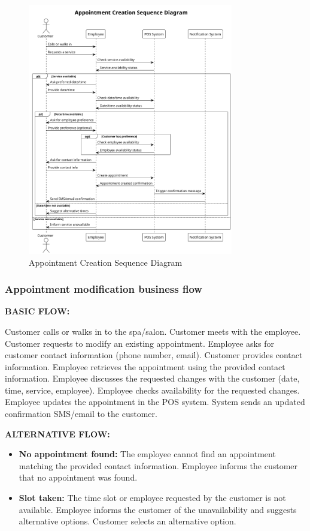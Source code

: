 \documentclass[]{VUMIFTemplateClass}
\begin{document}
\begin{figure}[H]
    \centering
    \includegraphics[width=0.8\textwidth]{images/diagrams/services/appointment_creation_sequence.png}
    \caption{Appointment Creation Sequence Diagram}
    \label{fig:appointment_creation_sequence}
\end{figure}

\subsubsection{Appointment modification business flow}

\textbf{BASIC FLOW:}

Customer calls or walks in to the spa/salon.
Customer meets with the employee.
Customer requests to modify an existing appointment.
Employee asks for customer contact information (phone number, email).
Customer provides contact information.
Employee retrieves the appointment using the provided contact information.
Employee discusses the requested changes with the customer (date, time, service, employee).
Employee checks availability for the requested changes.
Employee updates the appointment in the POS system.
System sends an updated confirmation SMS/email to the customer.

\textbf{ALTERNATIVE FLOW:}

\begin{itemize}
\item \textbf{No appointment found: } The employee cannot find an appointment matching the provided contact information.
Employee informs the customer that no appointment was found. 
\item \textbf{Slot taken: } The time slot or employee requested by the customer is not available.
Employee informs the customer of the unavailability and suggests alternative options.
Customer selects an alternative option.
\end{itemize}
\end{document}
